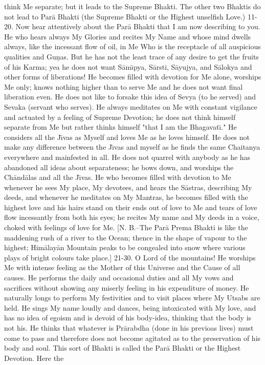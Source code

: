 think Me separate; but it leads to the Supreme Bhakti. The other two Bhaktis do not lead to Par\=a Bhakti (the Supreme Bhakti or the Highest unselfish Love.)
11-20. Now hear attentively about the Par\=a Bhakti that I am now describing to you. He who hears always My Glories and recites My Name and whose mind dwells always, like the incessant flow of oil, in Me Who is the receptacle of all auspicious qualities and Gu\d{n}as. But he has not the least trace of any desire to get the fruits of his Karma; yea he does not want S\=am\={\i}pya, S\=arsti, S\=ayujya, and S\=alokya and other forms of liberations! He becomes filled with devotion for Me alone, worships Me only; knows nothing higher than to serve Me and he does not want final liberation even. He does not like to forsake this idea of Sevya (to he served) and Sevaka (servant who serves). He always meditates on Me with constant vigilance and actuated by a feeling of Supreme Devotion; he does not think himself separate from Me but rather thinks himself "that I am the Bhagavat\={\i}." He considers all the J\={\i}vas as Myself and loves Me as he loves himself. He does not make any difference between the J\={\i}vas and myself as he finds the same Chaitanya everywhere and mainfested in all. He does not quarrel with anybody as he has abandoned all ideas about separateness; he bows down, and worships the Ch\=and\=alas and all the J\={\i}vas. He who becomes filled with devotion to Me whenever he sees My place, My devotees, and hears the S\=astras, describing My deeds, and whenever he meditates on My Mantras, he becomes filled with the highest love and his hairs stand on their ends out of love to Me and tears of love flow incessantly from both his eyes; he recites My name and My deeds in a voice, choked with feelings of love for Me. [N. B.--The Par\=a Prema Bhakti is like the maddening rush of a river to the Ocean; thence in the shape of vapour to the highest; Him\=alay\=an Mountain peaks to be congealed into snow where various plays of bright colours take place.]
21-30. O Lord of the mountains! He worships Me with intense feeling as the Mother of this Universe and the Cause of all causes. He performs the daily and occasional duties and all My vows and sacrifices without showing any miserly feeling in his expenditure of money. He naturally longs to perform My festivities and to visit places where My Utsabs are held. He sings My name loudly and dances, being intoxicated with My love, and has no idea of egoism and is devoid of his body-idea, thinking that the body is not his. He thinks that whatever is Pr\=arabdha (done in his previoas lives) must come to pass and therefore does not become agitated as to the preservation of his body and soul. This sort of Bhakti is called the Par\=a Bhakti or the Highest Devotion. Here the

